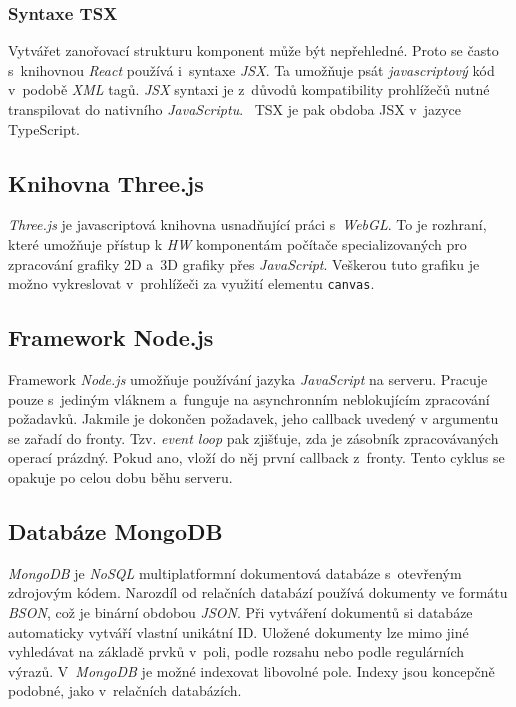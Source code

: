 \documentclass[a4paper,12pt]{article}
\def\code#1{\texttt{#1}}
\begin{document}
\subsubsection{Syntaxe TSX}

Vytvářet zanořovací strukturu komponent může být nepřehledné. Proto se často s~knihovnou \textit{React} používá i~syntaxe \textit{JSX}. Ta umožňuje psát \textit{javascriptový} kód v~podobě \textit{XML} tagů. \textit{JSX} syntaxi je z~důvodů kompatibility prohlížečů nutné transpilovat do nativního \textit{JavaScriptu}.~\cite{reactbook} TSX je pak obdoba JSX v~jazyce TypeScript.



\subsection{Knihovna Three.js}

\textit{Three.js} je javascriptová knihovna usnadňující práci s~\textit{WebGL}. To je rozhraní, které umožňuje přístup k \textit{HW} komponentám počítače specializovaných pro zpracování grafiky 2D a~3D grafiky přes \textit{JavaScript}. Veškerou tuto grafiku je možno vykreslovat v~prohlížeči za využití elementu \code{canvas}.~\cite{graphic}

\subsection{Framework Node.js}

Framework \textit{Node.js} umožňuje používání jazyka \textit{JavaScript} na serveru. Pracuje pouze s~jediným vláknem a~funguje na asynchronním neblokujícím zpracování požadavků. Jakmile je dokončen požadavek, jeho callback uvedený v argumentu se zařadí do fronty.  Tzv. \textit{event loop} pak zjišťuje, zda je zásobník zpracovávaných operací prázdný. Pokud ano, vloží do něj první callback z~fronty. Tento cyklus se opakuje po celou dobu běhu serveru.~\cite{node}

\subsection{Databáze MongoDB}

\textit{MongoDB} je \textit{NoSQL} multiplatformní dokumentová databáze s~otevřeným zdrojovým kódem. Narozdíl od relačních databází používá dokumenty ve formátu \textit{BSON}, což je binární obdobou \textit{JSON}. Při vytváření dokumentů si databáze automaticky vytváří vlastní unikátní ID.  Uložené dokumenty lze mimo jiné vyhledávat na základě prvků v~poli, podle rozsahu nebo podle regulárních výrazů. V~\textit{MongoDB} je možné indexovat libovolné pole. Indexy jsou koncepčně podobné, jako v~relačních databázích.~\cite{mongomongoose}
\end{document}
